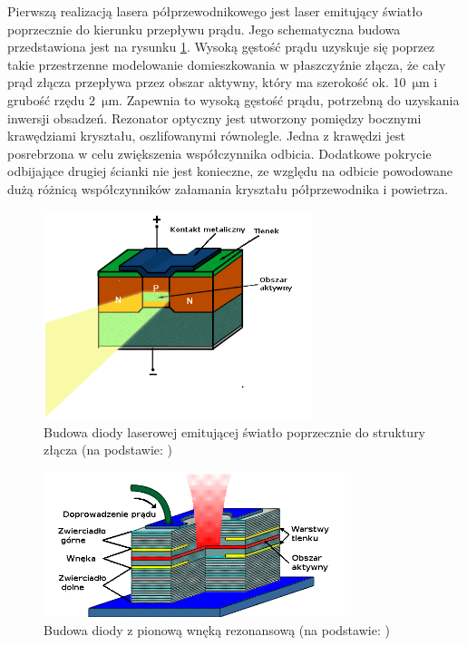 \documentclass[a4paper,10pt,twoside]{report}
\begin{document}
Pierwszą realizacją lasera półprzewodnikowego jest laser emitujący światło poprzecznie do kierunku przepływu prądu. Jego schematyczna budowa przedstawiona jest na rysunku \ref{rys-eel}. Wysoką gęstość prądu uzyskuje się poprzez takie przestrzenne modelowanie domieszkowania w płaszczyźnie złącza, że cały prąd złącza przepływa przez obszar aktywny, który ma szerokość ok. 10~$\mathrm{\mu m}$ i grubość rzędu 2~$\mathrm{\mu m}$. Zapewnia to wysoką gęstość prądu, potrzebną do uzyskania inwersji obsadzeń. Rezonator optyczny jest utworzony pomiędzy bocznymi krawędziami kryształu, oszlifowanymi równolegle. Jedna z krawędzi jest posrebrzona w celu zwiększenia współczynnika odbicia. Dodatkowe pokrycie odbijające drugiej ścianki nie jest konieczne, ze względu na odbicie powodowane dużą różnicą współczynników załamania kryształu półprzewodnika i powietrza.

\begin{figure}
\begin{center}
 \includegraphics[width=0.7\textwidth]{./obrazki/rys-eel.png}
\end{center}
\caption{Budowa diody laserowej emitującej światło poprzecznie do struktury złącza (na podstawie: \cite{rys-laserki})}
\label{rys-eel}
\end{figure}


\begin{figure}
\begin{center}
 \includegraphics[width=0.8\textwidth]{./obrazki/rys-vcsel.png}
\end{center}
\caption{Budowa diody z pionową wnęką rezonansową (na podstawie: \cite{rys-laserki})}
\label{rys-vcsel}
\end{figure}
\end{document}
